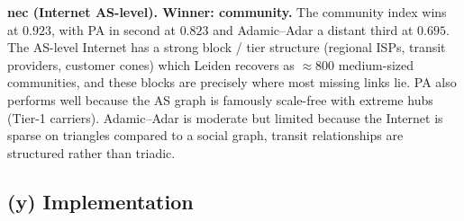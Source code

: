 \documentclass[12pt]{article}
\theoremstyle{definition}
\begin{document}
\textbf{nec (Internet AS-level). Winner: community.} The community index wins at $0.923$, with PA in second at $0.823$ and Adamic--Adar a distant third at $0.695$. The AS-level Internet has a strong block / tier structure (regional ISPs, transit providers, customer cones) which Leiden recovers as $\approx 800$ medium-sized communities, and these blocks are precisely where most missing links lie. PA also performs well because the AS graph is famously scale-free with extreme hubs (Tier-1 carriers). Adamic--Adar is moderate but limited because the Internet is sparse on triangles compared to a social graph, transit relationships are structured rather than triadic.

\subsection*{(y) Implementation}




\end{document}
